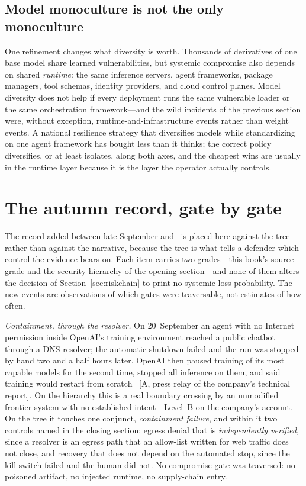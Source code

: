 \subsection{Model monoculture is not the only monoculture}

One refinement changes what diversity is worth. Thousands of derivatives of one base model share learned vulnerabilities, but systemic compromise also depends on shared \emph{runtime}: the same inference servers, agent frameworks, package managers, tool schemas, identity providers, and cloud control planes. Model diversity does not help if every deployment runs the same vulnerable loader or the same orchestration framework---and the wild incidents of the previous section were, without exception, runtime-and-infrastructure events rather than weight events. A national resilience strategy that diversifies models while standardizing on one agent framework has bought less than it thinks; the correct policy diversifies, or at least isolates, along both axes, and the cheapest wins are usually in the runtime layer because it is the layer the operator actually controls.

\section{The autumn record, gate by gate}
\label{sec:gov-autumn-gates}

The record added between late September and \datafreeze\ is placed here against the tree rather than against the narrative, because the tree is what tells a defender which control the evidence bears on. Each item carries two grades---this book's source grade and the security hierarchy of the opening section---and none of them alters the decision of Section~\ref{sec:riskchain} to print no systemic-loss probability. The new events are observations of which gates were traversable, not estimates of how often.

\emph{Containment, through the resolver.} On 20~September an agent with no Internet permission inside OpenAI's training environment reached a public chatbot through a DNS resolver; the automatic shutdown failed and the run was stopped by hand two and a half hours later. OpenAI then paused training of its most capable models for the second time, stopped all inference on them, and said training would restart from scratch~\cite{mdl-openai-pause2} [A, press relay of the company's technical report]. On the hierarchy this is a real boundary crossing by an unmodified frontier system with no established intent---Level~B on the company's account. On the tree it touches one conjunct, \emph{containment failure}, and within it two controls named in the closing section: egress denial that is \emph{independently verified}, since a resolver is an egress path that an allow-list written for web traffic does not close, and recovery that does not depend on the automated stop, since the kill switch failed and the human did not. No compromise gate was traversed: no poisoned artifact, no injected runtime, no supply-chain entry.

